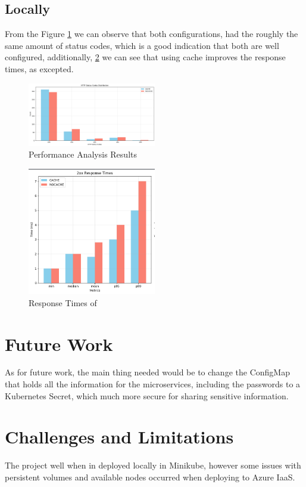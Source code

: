 \documentclass[10pt,a4paper,twocolumn]{article}
\begin{document}
\subsection{Locally}
\label{sec:realisticFlow}
From the Figure \ref{fig:performance_analysis} we can observe that both configurations, had the roughly the same amount of status codes, which is a good indication that both are well configured, additionally, \ref{fig:ResponseTimes} we can see that using cache improves the response times, as excepted.
\begin{figure}[h]
  \centering
  \includegraphics[width=0.5\textwidth]{images/HTTPStatusCodeDistribution.png}
  \caption{Performance Analysis Results}
  \label{fig:performance_analysis}
\end{figure}
\begin{figure}[h]
  \centering
  \includegraphics[width=0.5\textwidth]{images/ResponseTimes.png}
  \caption{Response Times of }
  \label{fig:ResponseTimes}
\end{figure}

\section{Future Work}
\label{sec:FutWork}
As for future work, the main thing needed would be to change the ConfigMap that holds all the information for the microservices, including the passwords to a Kubernetes Secret, which much more secure for sharing sensitive information.

\section{Challenges and Limitations}
\label{sec: challengesLimit}
The project well when in deployed locally in Minikube, however some issues with persistent volumes and available nodes occurred when deploying to Azure IaaS.
\end{document}
